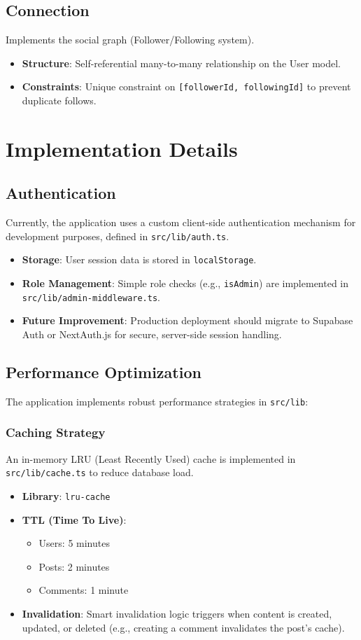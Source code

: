 \documentclass{article}
\begin{document}
\subsection{Connection}
Implements the social graph (Follower/Following system).
\begin{itemize}
    \item \textbf{Structure}: Self-referential many-to-many relationship on the User model.
    \item \textbf{Constraints}: Unique constraint on \texttt{[followerId, followingId]} to prevent duplicate follows.
\end{itemize}

\section{Implementation Details}

\subsection{Authentication}
Currently, the application uses a custom client-side authentication mechanism for development purposes, defined in \texttt{src/lib/auth.ts}.
\begin{itemize}
    \item \textbf{Storage}: User session data is stored in \texttt{localStorage}.
    \item \textbf{Role Management}: Simple role checks (e.g., \texttt{isAdmin}) are implemented in \texttt{src/lib/admin-middleware.ts}.
    \item \textbf{Future Improvement}: Production deployment should migrate to Supabase Auth or NextAuth.js for secure, server-side session handling.
\end{itemize}

\subsection{Performance Optimization}
The application implements robust performance strategies in \texttt{src/lib}:

\subsubsection{Caching Strategy}
An in-memory LRU (Least Recently Used) cache is implemented in \texttt{src/lib/cache.ts} to reduce database load.
\begin{itemize}
    \item \textbf{Library}: \texttt{lru-cache}
    \item \textbf{TTL (Time To Live)}:
    \begin{itemize}
        \item Users: 5 minutes
        \item Posts: 2 minutes
        \item Comments: 1 minute
    \end{itemize}
    \item \textbf{Invalidation}: Smart invalidation logic triggers when content is created, updated, or deleted (e.g., creating a comment invalidates the post's cache).
\end{itemize}
\end{document}
